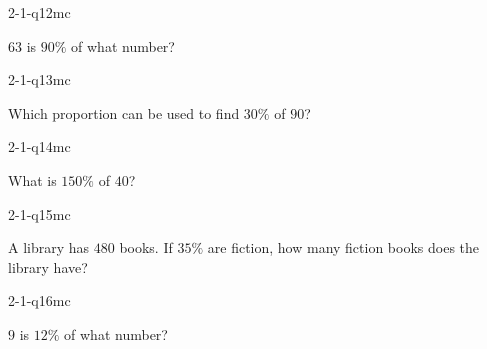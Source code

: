 \begin{practiceQuestion}{2-1-q12}{mc}
\begin{questionText}
$63$ is $90\%$ of what number?
\end{questionText}
\end{practiceQuestion}

\begin{practiceQuestion}{2-1-q13}{mc}
\begin{questionText}
Which proportion can be used to find $30\%$ of $90$?
\end{questionText}
\end{practiceQuestion}

\begin{practiceQuestion}{2-1-q14}{mc}
\begin{questionText}
What is $150\%$ of $40$?
\end{questionText}
\end{practiceQuestion}

\begin{practiceQuestion}{2-1-q15}{mc}
\begin{questionText}
A library has $480$ books. If $35\%$ are fiction, how many fiction books does the library have?
\end{questionText}
\end{practiceQuestion}

\begin{practiceQuestion}{2-1-q16}{mc}
\begin{questionText}
$9$ is $12\%$ of what number?
\end{questionText}
\end{practiceQuestion}

